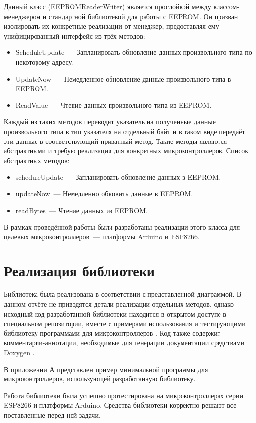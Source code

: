 Данный класс (EEPROMReaderWriter) является прослойкой между классом-менеджером и стандартной библиотекой для работы с EEPROM.
Он призван изолировать их конкретные реализации от менеджер, предоставляя ему унифицированный интерфейс из трёх методов:

\begin{itemize}
	\item ScheduleUpdate~--- Запланировать обновление данных произвольного типа по некоторому адресу.
	\item UpdateNow~---	Немедленное обновление данные произвольного типа в EEPROM.
	\item ReadValue~--- Чтение данных произвольного типа из EEPROM.
\end{itemize}

Каждый из таких методов переводит указатель на полученные данные произвольного типа в тип указателя на отдельный байт и в таком виде передаёт эти данные в соответствующий приватный метод.
Такие методы являются абстрактными и требую реализации для конкретных микроконтроллеров.
Список абстрактных методов:
\begin{itemize}
	\item scheduleUpdate~--- Запланировать обновление данных в EEPROM.
	\item updateNow~--- Немедленно обновить данные в EEPROM.
	\item readBytes~---	Чтение данных из EEPROM.
\end{itemize}

В рамках проведённой работы были разработаны реализации этого класса для целевых микроконтроллеров~--- платформы Arduino и ESP8266.


\section{Реализация библиотеки}

Библиотека была реализована в соответствии с представленной диаграммой.
В данном отчёте не приводятся детали реализации отдельных методов, однако исходный код разработанной библиотеки находится в открытом доступе в специальном репозитории, вместе с примерами использования и тестирующими библиотеку программами для микроконтроллеров \cite{web:eepromanager}.
Код также содержит комментарии-аннотации, необходимые для генерации документации средствами Doxygen \cite{web:doxygen}.

В приложении А представлен пример минимальной программы для микроконтроллеров, использующей разработанную библиотеку. 

Работа библиотеки была успешно протестирована на микроконтроллерах серии ESP8266 и платформы Arduino.
Средства библиотеки корректно решают все поставленные перед ней задачи.
